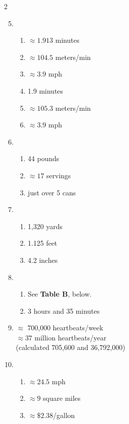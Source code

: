 \begin{multicols} {2}
\begin{enumerate}
\setcounter{enumi}{4}

\item %
\begin{enumerate}
\item $\approx 1.913$ minutes
\item $\approx 104.5$ meters/min
\item $\approx 3.9$ mph
\item 1.9 minutes
\item $\approx 105.3$ meters/min
\item $\approx 3.9$ mph
\end{enumerate}

\item \begin{enumerate}
\item 44 pounds %
\item $\approx 17$ servings %
\item just over 5 cans %
\end{enumerate}

\item \begin{enumerate}
\item 1,320 yards %
\item 1.125 feet %
\item 4.2 inches %
\end{enumerate}

\item %
\begin{enumerate}
\item See \textbf{Table B}, below.
\item 3 hours and 35 minutes
\end{enumerate}

\item %
$\approx$ 700,000 heartbeats/week \\ $\approx 37$ million heartbeats/year \\
(calculated  705,600 and 36,792,000)

\item %
\begin{enumerate}
\item $\approx 24.5$ mph
\item $\approx 9$ square miles
\item $\approx \$2.38$/gallon
\end{enumerate}

\end{enumerate}
\end{multicols}

